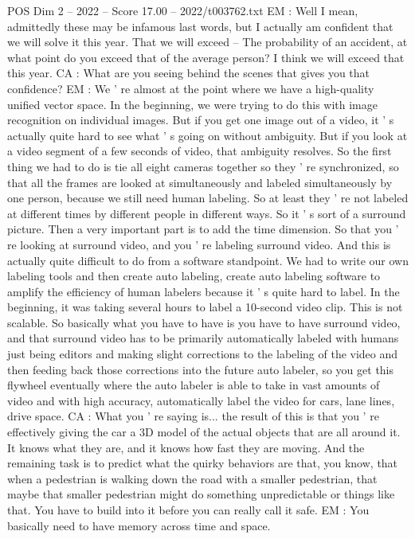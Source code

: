 \begin{textsample}{POS Dim 2 – 2022 – Score 17.00 – 2022/t003762.txt}
EM : Well I mean, admittedly these may be infamous last words, but I actually am confident that we will solve it this year.
That we will exceed -- The probability of an accident, at what point do you exceed that of the average person?
I think we will exceed that this year.
CA : What are you seeing behind the scenes that gives you that confidence?
EM : We ' re almost at the point where we have a high-quality unified vector space.
In the beginning, we were trying to do this with image recognition on individual images.
But if you get one image out of a video, it ' s actually quite hard to see what ' s going on without ambiguity.
But if you look at a video segment of a few seconds of video, that ambiguity resolves.
So the first thing we had to do is tie all eight cameras together so they ' re synchronized, so that all the frames are looked at simultaneously and labeled simultaneously by one person, because we still need human labeling.
So at least they ' re not labeled at different times by different people in different ways.
So it ' s sort of a surround picture.
Then a very important part is to add the time dimension.
So that you ' re looking at surround video, and you ' re labeling surround video.
And this is actually quite difficult to do from a software standpoint.
We had to write our own labeling tools and then create auto labeling, create auto labeling software to amplify the efficiency of human labelers because it ' s quite hard to label.
In the beginning, it was taking several hours to label a 10-second video clip.
This is not scalable.
So basically what you have to have is you have to have surround video, and that surround video has to be primarily automatically labeled with humans just being editors and making slight corrections to the labeling of the video and then feeding back those corrections into the future auto labeler, so you get this flywheel eventually where the auto labeler is able to take in vast amounts of video and with high accuracy, automatically label the video for cars, lane lines, drive space.
CA : What you ' re saying is... the result of this is that you ' re effectively giving the car a 3D model of the actual objects that are all around it.
It knows what they are, and it knows how fast they are moving.
And the remaining task is to predict what the quirky behaviors are that, you know, that when a pedestrian is walking down the road with a smaller pedestrian, that maybe that smaller pedestrian might do something unpredictable or things like that.
You have to build into it before you can really call it safe.
EM : You basically need to have memory across time and space.

\end{textsample}

